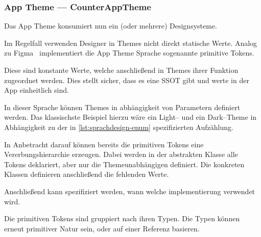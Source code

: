 \subsubsection{App Theme --- CounterAppTheme}
Das App Theme konsumiert nun ein (oder mehrere) Designsysteme.

Im Regelfall verwenden Designer in Themes nicht direkt statische Werte.
Analog zu Figma~\autocite{figma-inc-no-date} implementiert die App Theme Sprache sogenannte primitive Tokens.


Diese sind konstante Werte, welche anschließend in Themes ihrer Funktion zugeordnet werden.
Dies stellt sicher, dass es eine \ac{SSOT} gibt und werte in der App einheitlich sind.

In dieser Sprache können Themes in abhängigkeit von Parametern definiert werden.
Das klassischste Beispiel hierzu wäre ein Light-- und ein Dark--Theme in Abhängigkeit zu der in \autoref{lst:sprachdesign-enum} spezifizierten Aufzählung.

In Anbetracht darauf können bereits die primitiven Tokens eine Vererbungshierarchie erzeugen.
Dabei werden in der abstrakten Klasse alle Tokens deklariert, aber nur die Themeunabhängigen definiert.
Die konkreten Klassen definieren anschließend die fehlenden Werte.

Anschließend kann spezifiziert werden, wann welche implementierung verwendet wird.

Die primitiven Tokens sind gruppiert nach ihren Typen.
Die Typen können erneut primitiver Natur sein, oder auf einer Referenz basieren.

